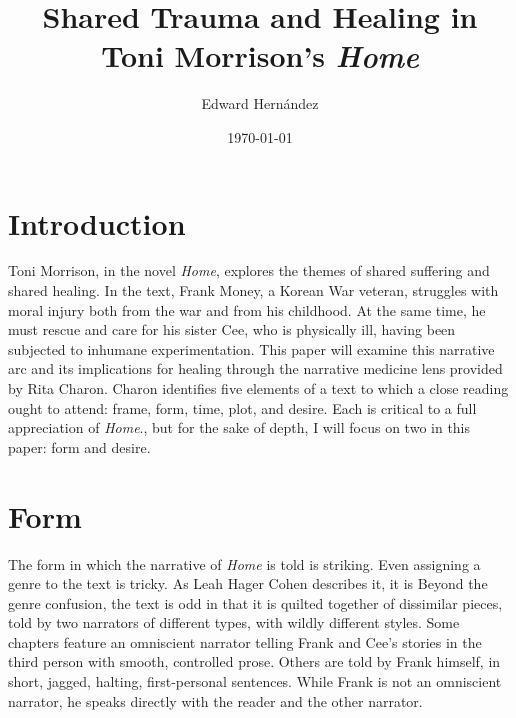 \documentclass[12pt]{article}
\begin{document}
\title{Shared Trauma and Healing in Toni Morrison's \emph{Home}}
\author{Edward Hern\'{a}ndez}
\date{\today}

\maketitle


\vspace{12pt}

\section{Introduction} Toni Morrison, in the novel
\emph{Home}\autocite{Morrison12}, explores the themes of shared suffering and
shared healing. In the text, Frank Money, a Korean War veteran, struggles with
moral injury both from the war and from his childhood. At the same time, he
must rescue and care for his sister Cee, who is physically ill, having been
subjected to inhumane experimentation.  This paper will examine this narrative
arc and its implications for healing through the narrative medicine lens
provided by Rita Charon.\autocite[ch.~6]{Charon06} Charon identifies five
elements of a text to which a close reading ought to attend: frame, form, time,
plot, and desire. Each is critical to a full appreciation of \emph{Home}., but
for the sake of depth, I will focus on two in this paper: form and desire.

\section{Form}

The form in which the narrative of \emph{Home} is told is striking. Even
assigning a genre to the text is tricky. As Leah Hager Cohen describes it, it
is \autocite{HagerCohen12} Beyond the genre confusion,
the text is odd in that it is quilted together of dissimilar pieces, told by
two narrators of different types, with wildly different styles. Some chapters
feature an omniscient narrator telling Frank and Cee's stories in the third
person with smooth, controlled prose. Others are told by Frank himself, in
short, jagged, halting, first-personal sentences. While Frank is not an
omniscient narrator, he speaks directly with the reader and the other narrator.
\end{document}
